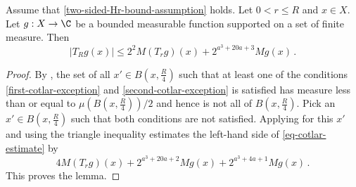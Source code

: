 \begin{lemma}
\label{Cotlar-estimate}
\leanok
{}
Assume that \eqref{two-sided-Hr-bound-assumption} holds.
Let $0<r\le R$ and  $x\in X$. Let $g:X\to\C$ be a bounded measurable function supported on a set of finite measure. Then
\begin{equation}\label{eq-cotlar-estimate}
|T_Rg(x)| \le 2^{2}M(T_rg)(x)+ 2^{a^3+20a+3} Mg(x)
\, .
\end{equation}
\end{lemma}


\begin{proof}
By , the set of all $x'\in B(x,\frac {R} 4)$
such that at least one of the conditions
\eqref{first-cotlar-exception} and
\eqref{second-cotlar-exception} is satisfied has measure less than or equal to $\mu(B(x,\frac{R}{4}))/2$ and hence is not all of $B(x,\frac {R} 4)$.
Pick an $x'\in B(x,\frac {R} 4)$ such that both conditions are not satisfied.
Applying  for this $x'$ and using the triangle inequality
estimates the left-hand side of \eqref{eq-cotlar-estimate}
by
\begin{equation}
    4 M(T_rg)(x) + 2^{a^3 + 20a + 2} Mg(x) + 2^{a^3 + 4a + 1} Mg(x)\, .
\end{equation}
This proves the lemma.
\end{proof}

